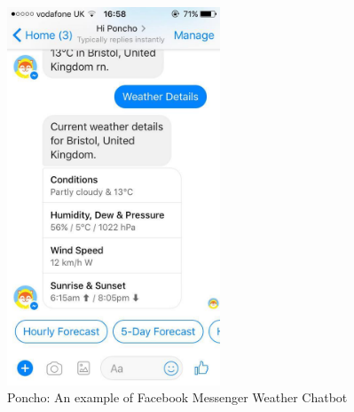 \begin{figure}[ht] %
    \centering
    \includegraphics[width=2.5in]{../resources/poncho.jpg}
    \caption{Poncho: An example of Facebook Messenger Weather Chatbot}
    \label{fig:poncho}
\end{figure}

\newpage









